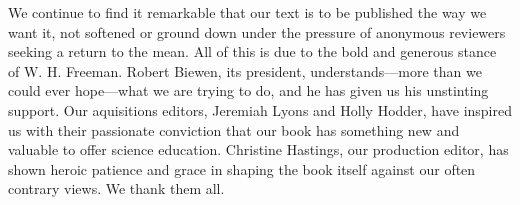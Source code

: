 We continue to find it remarkable that our text is to be published the
way we want it, not softened or ground down under the pressure of
anonymous reviewers seeking a return to the mean.  All of this is due
to the bold and generous stance of W. H. Freeman.  Robert Biewen, its
president, understands---more than we could ever hope---what we are
trying to do, and he has given us his unstinting support.  Our
aquisitions editors, Jeremiah Lyons and Holly Hodder, have inspired us
with their passionate conviction that our book has something new and
valuable to offer science education.  Christine Hastings, our
production editor, has shown heroic patience and grace in shaping the
book itself against our often contrary views.  We thank them all.